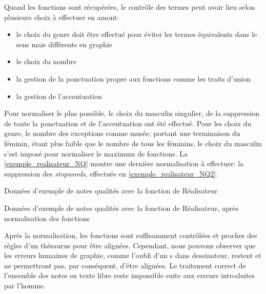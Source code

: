 Quand les fonctions sont récupérées, le contrôle des termes peut avoir lieu selon plusieurs choix à effectuer en amont:
\begin{itemize}
	\item le choix du genre doit être effectué pour éviter les termes équivalents dans le sens mais différents en graphie
	\item le choix du nombre
	\item la gestion de la ponctuation propre aux fonctions comme les traits d'union
	\item la gestion de l'accentuation
\end{itemize}
Pour normaliser le plus possible, le choix du masculin singulier, de la suppression de toute la ponctuation et de l'accentuation ont été effectué. Pour les choix du genre, le nombre des exceptions comme \og musée\fg{}, portant une terminaison du féminin, étant plus faible que le nombre de tous les féminins, le choix du masculin s'est imposé pour normaliser le maximum de fonctions. La \autoref{exemple_realisateur_NQ} montre une dernière normalisation à effectuer: la suppression des \textit{stopwords}, effectuée en \autoref{exemple_realisateur_NQ2}.
\begin{table}[!h]
	\centering
	\caption{Données d'exemple de notes qualités avec la fonction de Réalisateur}
	\label{exemple_realisateur_NQ}
\end{table}
\begin{table}[!h]
	\centering
	\caption{Données d'exemple de notes qualités avec la fonction de Réalisateur, après normalisation des fonctions}
	\label{exemple_realisateur_NQ2}
\end{table}
\bigskip

Après la normalisation, les fonctions sont suffisamment contrôlées et proches des règles d'un thésaurus pour être alignées. Cependant, nous pouvons observer que les erreurs humaines de graphie, comme l'oubli d'un \og s\fg{} dans \og dessinateur\fg{}, restent et ne permettront pas, par conséquent, d'être alignées. Le traitement correct de l'ensemble des notes en texte libre reste impossible suite aux erreurs introduites par l'homme.\\

